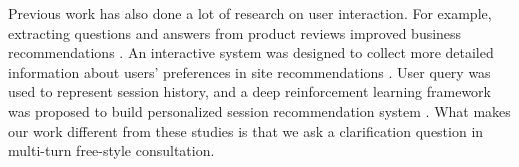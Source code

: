 Previous work has also done a lot of research on user interaction. 
For example, extracting questions and answers from product reviews improved business recommendations \citep{DBLP:conf/cikm/ZhangCA0C18}. 
An interactive system was designed to collect more detailed information about users' preferences in site recommendations \citep{DBLP:conf/kdd/Christakopoulou16}. 
User query was used to represent session history, and a deep reinforcement learning framework was proposed to build personalized session recommendation system \citep{DBLP:conf/sigir/SunZ18}.
What makes our work different from these studies is that we ask a clarification question in multi-turn free-style consultation.
